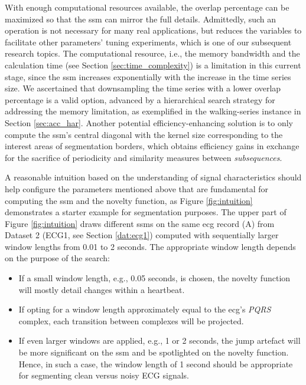 With enough computational resources available, the overlap percentage can be maximized so that the \gls{ssm} can mirror the full details. Admittedly, such an operation is not necessary for many real applications, but reduces the variables to facilitate other parameters' tuning experiments, which is one of our subsequent research topics.
The computational resource, i.e., the memory bandwidth and the calculation time (see Section \ref{sec:time_complexity}) is a limitation in this current stage, since the \gls{ssm} increases exponentially with the increase in the time series size. We ascertained that downsampling the time series with a lower overlap percentage is a valid option, advanced by a hierarchical search strategy for addressing the memory limitation, as exemplified in the walking-series instance in Section \ref{sec:acc_har}. Another potential efficiency-enhancing solution is to only compute the \gls{ssm}'s central diagonal with the kernel size corresponding to the interest areas of segmentation borders, which obtains efficiency gains in exchange for the sacrifice of periodicity and similarity measures between \textit{subsequences}.

A reasonable intuition based on the understanding of signal characteristics should help configure the parameters mentioned above that are fundamental for computing the \gls{ssm} and the novelty function, as Figure \ref{fig:intuition} demonstrates a starter example for segmentation purposes. The upper part of Figure \ref{fig:intuition} draws different \gls{ssm}s on the same \gls{ecg} record (A) from Dataset 2 (ECG1, see Section \ref{dat:ecg1}) computed with sequentially larger window lengths from 0.01 to 2 seconds.
The appropriate window length depends on the purpose of the search:

\begin{itemize}
    \item If a small window length, e.g., 0.05 seconds, is chosen, the novelty function will mostly detail changes within a heartbeat.
    \item If opting for a window length approximately equal to the \gls{ecg}'s \textit{PQRS} complex, each transition between complexes will be projected.
    \item If even larger windows are applied, e.g., 1 or 2 seconds, the jump artefact will be more significant on the \gls{ssm} and be spotlighted on the novelty function. Hence, in such a case, the window length of 1 second should be appropriate for segmenting clean versus noisy ECG signals.
\end{itemize}

